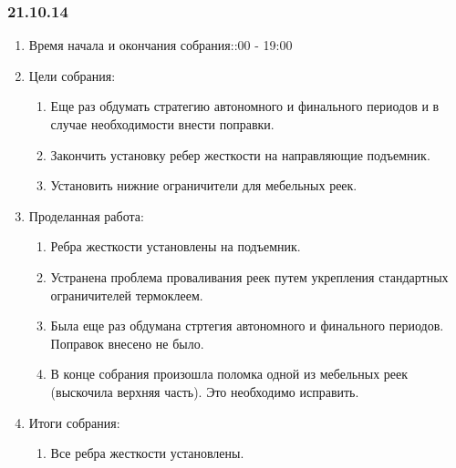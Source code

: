 	
\subsubsection{21.10.14}

\begin{enumerate}
	\item Время начала и окончания собрания::00 - 19:00
	\item Цели собрания:\newline
	\begin{enumerate}
	  \item Еще раз обдумать стратегию автономного и финального периодов и в случае необходимости внести поправки.\newline
	  
	  \item Закончить установку ребер жесткости на направляющие подъемник.\newline
	  
	  \item Установить нижние ограничители для мебельных реек.\newline
	  
    \end{enumerate}
    
	\item Проделанная работа:\newline
	\begin{enumerate}
	  \item Ребра жесткости установлены на подъемник.\newline
      
      \item Устранена проблема проваливания реек путем укрепления стандартных ограничителей термоклеем.\newline
      
      \item Была еще раз обдумана стртегия автономного и финального периодов. Поправок внесено не было.\newline
      
      \item В конце собрания произошла поломка одной из мебельных реек (выскочила верхняя часть). Это необходимо исправить.\newline
      
    \end{enumerate}
    
	\item Итоги собрания: \newline
	\begin{enumerate}
	  \item Все ребра жесткости установлены.\newline
	  

\end{enumerate}
\end{enumerate}
